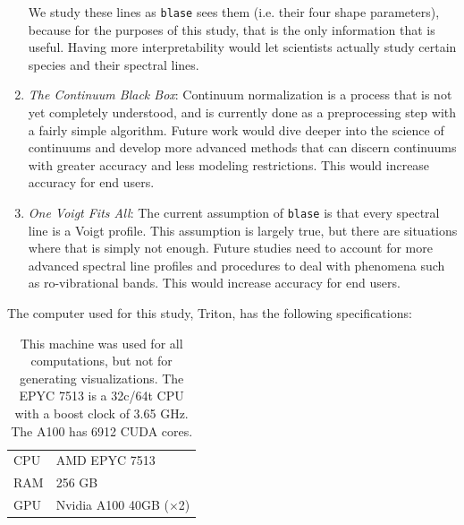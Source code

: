 \documentclass[twocolumn, linenumbers]{aastex631}
\begin{document}
\begin{enumerate}[label=-]
    We study these lines as \texttt{blase} sees them (i.e. their four shape parameters), because for the purposes of this study, that is the only information that is useful.
    Having more interpretability would let scientists actually study certain species and their spectral lines.
    \item \textit{The Continuum Black Box}: Continuum normalization is a process that is not yet completely understood, and is currently done as a preprocessing step with a fairly simple algorithm.
    Future work would dive deeper into the science of continuums and develop more advanced methods that can discern continuums with greater accuracy and less modeling restrictions.
    This would increase accuracy for end users.
    \item \textit{One Voigt Fits All}: The current assumption of \texttt{blase} is that every spectral line is a Voigt profile.
    This assumption is largely true, but there are situations where that is simply not enough.
    Future studies need to account for more advanced spectral line profiles and procedures to deal with phenomena such as ro-vibrational bands.
    This would increase accuracy for end users.
\end{enumerate}
The computer used for this study, Triton, has the following specifications:
\begin{table}[h!]
    \centering
    \begin{tabular}{ll}
        \hline
        CPU & AMD EPYC 7513\\
        RAM & 256 GB\\
        GPU & Nvidia A100 40GB ($\times$2)\\
        \hline
    \end{tabular}
    \caption{This machine was used for all computations, but not for generating visualizations. The EPYC 7513 is a 32c/64t CPU with a boost clock of 3.65 GHz. The A100 has 6912 CUDA cores.}
\end{table}
\end{document}
